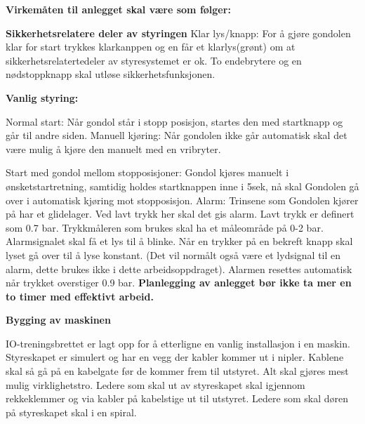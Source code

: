 {\bf Virkemåten til anlegget skal  være som følger:}
\vskip 10pt 

{\bf Sikkerhetsrelatere deler av styringen}
\vskip 10pt
Klar lys/knapp: For å gjøre gondolen klar for start trykkes klarkanppen og en får et klarlys(grønt) om at sikkerhetsrelatertedeler av styresystemet er ok. To endebrytere og en nødstoppknapp skal utløse sikkerhetsfunksjonen. 
\vskip 10pt 

\textbf{Vanlig styring:}
\vskip 10pt 

Normal start: Når gondol står i stopp posisjon, startes den med startknapp og går til andre siden.
\vskip 10pt 
Manuell kjøring: Når gondolen ikke går automatisk skal det være mulig å kjøre den manuelt med en vribryter. 

\vskip 10pt 
Start med gondol mellom stopposisjoner: Gondol kjøres manuelt i ønsketstartretning, samtidig holdes startknappen inne i 5sek, nå skal Gondolen gå over i automatisk kjøring mot stopposisjon.
\vskip 10pt 
Alarm: Trinsene som Gondolen kjører på har et glidelager. Ved lavt trykk her skal det gis alarm. Lavt trykk er definert som 0.7 bar. Trykkmåleren som brukes skal ha et måleområde på 0-2 bar. Alarmsignalet skal få et lys til å blinke. Når en trykker på en bekreft knapp skal lyset gå over til å lyse konstant. (Det vil normålt også være et lydsignal til en alarm, dette brukes ikke i dette arbeidsoppdraget). Alarmen resettes automatisk når trykket overstiger 0.9 bar. 
\vskip 10pt 
{\bf Planlegging av anlegget bør ikke ta mer en to timer med effektivt arbeid. }
\vfil \eject

\noindent
{\bf Bygging av maskinen}

\vskip 5pt

IO-treningsbrettet er lagt opp for å etterligne en vanlig installasjon i en maskin. Styreskapet er simulert og har en vegg der kabler kommer ut i nipler. Kablene skal så gå på en kabelgate før de kommer frem til utstyret. Alt skal gjøres mest mulig virklighetstro. Ledere som skal ut av styreskapet skal igjennom rekkeklemmer og via kabler på kabelstige ut til utstyret. Ledere som skal døren på styreskapet skal i en spiral. 


